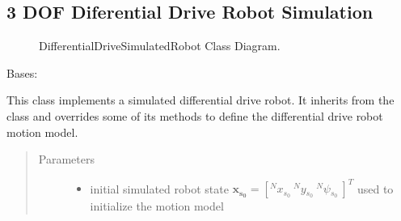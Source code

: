 \documentclass[letterpaper,10pt,english]{sphinxmanual}
\begin{document}
\subsection{3 DOF Diferential Drive Robot Simulation}
\label{\detokenize{robot_simulation:dof-diferential-drive-robot-simulation}}
\begin{figure}[htbp]
\centering
\capstart

\noindent{}
\caption{DifferentialDriveSimulatedRobot Class Diagram.}\label{\detokenize{robot_simulation:id2}}\end{figure}

\begin{fulllineitems}
\label{\detokenize{robot_simulation:DifferentialDriveSimulatedRobot.DifferentialDriveSimulatedRobot}}
\sphinxAtStartPar
Bases: {\hyperref[\detokenize{robot_simulation:SimulatedRobot.SimulatedRobot}]{}}

\sphinxAtStartPar
This class implements a simulated differential drive robot. It inherits from the  class and
overrides some of its methods to define the differential drive robot motion model.

\begin{fulllineitems}
\label{\detokenize{robot_simulation:DifferentialDriveSimulatedRobot.DifferentialDriveSimulatedRobot.__init__}}\begin{quote}\begin{description}
\item[{Parameters}] \leavevmode\begin{itemize}
\item {} 
\sphinxAtStartPar
{} \textendash{} initial simulated robot state \(\mathbf{x_{s_0}}=[^Nx{_{s_0}}~^Ny{_{s_0}}~^N\psi{_{s_0}}~]^T\) used to initialize the  motion model


\end{itemize}
\end{description}
\end{quote}
\end{fulllineitems}
\end{fulllineitems}
\end{document}
